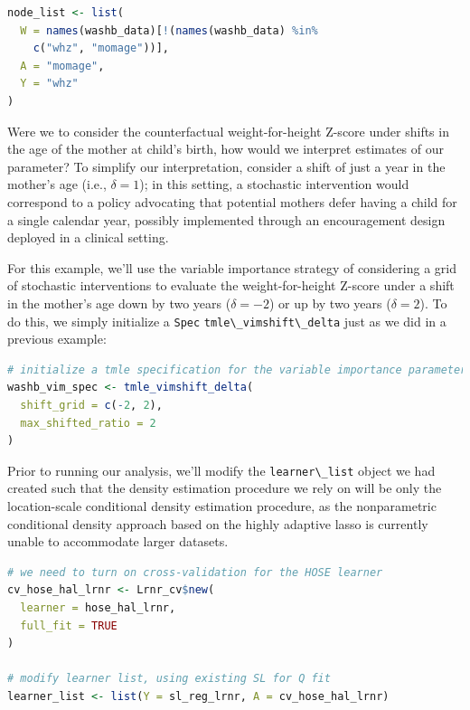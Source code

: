 \documentclass[
  12pt, krantz2,
]{krantz}
\newcommand{\passthrough}[1]{#1}
\theoremstyle{definition}
\theoremstyle{definition}
\theoremstyle{definition}
\newcommand{\1}{\mathbbm{1}}
\begin{document}
\begin{lstlisting}[language=R]
node_list <- list(
  W = names(washb_data)[!(names(washb_data) %in%
    c("whz", "momage"))],
  A = "momage",
  Y = "whz"
)
\end{lstlisting}

Were we to consider the counterfactual weight-for-height Z-score under shifts in
the age of the mother at child's birth, how would we interpret estimates of our
parameter? To simplify our interpretation, consider a shift of just a year in
the mother's age (i.e., \(\delta = 1\)); in this setting, a stochastic
intervention would correspond to a policy advocating that potential mothers
defer having a child for a single calendar year, possibly implemented through an
encouragement design deployed in a clinical setting.

For this example, we'll use the variable importance strategy of considering a
grid of stochastic interventions to evaluate the weight-for-height Z-score under
a shift in the mother's age down by two years (\(\delta = -2\)) or up by two years
(\(\delta = 2\)). To do this, we simply initialize a \passthrough{\lstinline!Spec!} \passthrough{\lstinline!tmle\_vimshift\_delta!}
just as we did in a previous example:

\begin{lstlisting}[language=R]
# initialize a tmle specification for the variable importance parameter
washb_vim_spec <- tmle_vimshift_delta(
  shift_grid = c(-2, 2),
  max_shifted_ratio = 2
)
\end{lstlisting}

Prior to running our analysis, we'll modify the \passthrough{\lstinline!learner\_list!} object we had
created such that the density estimation procedure we rely on will be only the
location-scale conditional density estimation procedure, as the nonparametric
conditional density approach based on the highly adaptive lasso \citep{diaz2011super, benkeser2016hal, coyle2020hal9001, hejazi2020hal9001, hejazi2020haldensify}
is currently unable to accommodate larger datasets.

\begin{lstlisting}[language=R]
# we need to turn on cross-validation for the HOSE learner
cv_hose_hal_lrnr <- Lrnr_cv$new(
  learner = hose_hal_lrnr,
  full_fit = TRUE
)

# modify learner list, using existing SL for Q fit
learner_list <- list(Y = sl_reg_lrnr, A = cv_hose_hal_lrnr)
\end{lstlisting}
\end{document}
